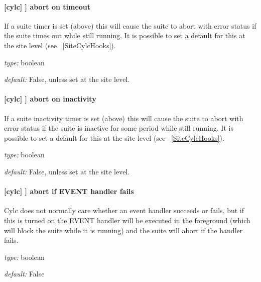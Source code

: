 \paragraph[abort on timeout]{[cylc] \textrightarrow [[events]] \textrightarrow abort on timeout}

If a suite timer is set (above) this will cause the suite to abort with
error status if the suite times out while still running. It is possible to set
a default for this at the site level (see ~\ref{SiteCylcHooks}).

\begin{myitemize}
    \item {\em type:} boolean
    \item {\em default:} False, unless set at the site level.
\end{myitemize}

\paragraph[abort on inactivity]{[cylc] \textrightarrow [[events]] \textrightarrow abort on inactivity}

If a suite inactivity timer is set (above) this will cause the suite to abort
with error status if the suite is inactive for some period while still running.
It is possible to set a default for this at the site level
(see ~\ref{SiteCylcHooks}).

\begin{myitemize}
    \item {\em type:} boolean
    \item {\em default:} False, unless set at the site level.
\end{myitemize}

\paragraph[abort if startup handler fails]{[cylc] \textrightarrow [[events]] \textrightarrow abort if EVENT handler fails}

Cylc does not normally care whether an event handler succeeds or fails,
but if this is turned on the EVENT handler will be executed in the
foreground (which will block the suite while it is running) and the
suite will abort if the handler fails.

\begin{myitemize}
    \item {\em type:} boolean
    \item {\em default:} False
\end{myitemize}


